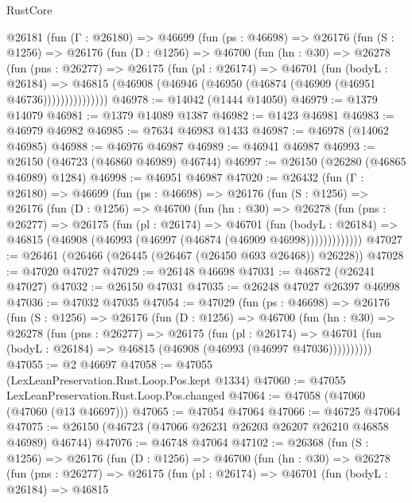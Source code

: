 \begin{lexlean}{RustCore}
\begin{coremodule}
    @26181
      (fun (Γ : @26180) =>
      @46699
        (fun (ps : @46698) =>
        @26176
          (fun (S : @1256) =>
          @26176
            (fun (D : @1256) =>
            @46700
              (fun (hn : @30) =>
              @26278
                (fun (pns : @26277) =>
                @26175
                  (fun (pl : @26174) =>
                  @46701
                    (fun (bodyL : @26184) =>
                    @46815 (@46908 (@46946 (@46950 (@46874 (@46909 (@46951 @46736)))))))))))))))
@46978 := @14042 (@1444 @14050)
@46979 := @1379 @14079
@46981 := @1379 @14089 @1387
@46982 := @1423 @46981
@46983 := @46979 @46982
@46985 := @7634 @46983 @1433
@46987 := @46978 (@14062 @46985)
@46988 := @46976 @46987
@46989 := @46941 @46987
@46993 := @26150 (@46723 (@46860 @46989) @46744)
@46997 := @26150 (@26280 (@46865 @46989) @1284)
@46998 := @46951 @46987
@47020 := @26432
    (fun (Γ : @26180) =>
    @46699
      (fun (ps : @46698) =>
      @26176
        (fun (S : @1256) =>
        @26176
          (fun (D : @1256) =>
          @46700
            (fun (hn : @30) =>
            @26278
              (fun (pns : @26277) =>
              @26175
                (fun (pl : @26174) =>
                @46701
                  (fun (bodyL : @26184) =>
                  @46815 (@46908 (@46993 (@46997 (@46874 (@46909 @46998)))))))))))))
@47027 := @26461 (@26466 (@26445 (@26467 (@26450 @693 @26468)) @26228))
@47028 := @47020 @47027
@47029 := @26148 @46698
@47031 := @46872 (@26241 @47027)
@47032 := @26150 @47031
@47035 := @26248 @47027 @26397 @46998
@47036 := @47032 @47035
@47054 := @47029
    (fun (ps : @46698) =>
    @26176
      (fun (S : @1256) =>
      @26176
        (fun (D : @1256) =>
        @46700
          (fun (hn : @30) =>
          @26278
            (fun (pns : @26277) =>
            @26175
              (fun (pl : @26174) =>
              @46701 (fun (bodyL : @26184) => @46815 (@46908 (@46993 (@46997 @47036))))))))))
@47055 := @2 @46697
@47058 := @47055 (LexLeanPreservation.Rust.Loop.Pos.kept @1334)
@47060 := @47055 LexLeanPreservation.Rust.Loop.Pos.changed
@47064 := @47058 (@47060 (@47060 (@13 @46697)))
@47065 := @47054 @47064
@47066 := @46725 @47064
@47075 := @26150 (@46723 (@47066 @26231 @26203 @26207 @26210 @46858 @46989) @46744)
@47076 := @46748 @47064
@47102 := @26368
    (fun (S : @1256) =>
    @26176
      (fun (D : @1256) =>
      @46700
        (fun (hn : @30) =>
        @26278
          (fun (pns : @26277) =>
          @26175
            (fun (pl : @26174) =>
            @46701
              (fun (bodyL : @26184) =>
              @46815

\end{coremodule}
\end{lexlean}
